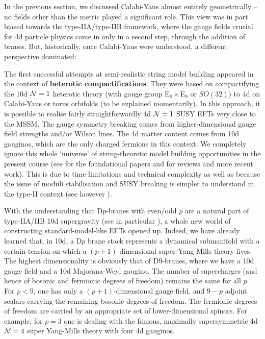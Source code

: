\documentclass[12pt]{article}
\numberwithin{equation}{section}
\begin{document}
In the previous section, we discussed Calabi-Yaus almost entirely geometrically -- no fields other than the metric played a significant role. This view was in part biased towards the type-IIA/type-IIB framework, where the gauge fields crucial for 4d particle physics come in only in a second step, through the addition of branes. But, historically, once Calabi-Yaus were understood, a different perspective dominated:

The first successful attempts at semi-realistic string model building appeared in the context of {\bf heterotic compactifications}. They were based on compactifying the 10d ${\cal N}=1$ heterotic theory (with gauge group E$_8\times$E$_8$ or $SO(32)$) to 4d on Calabi-Yaus or torus orbifolds (to be explained momentarily). In this approach, it is possible to realise fairly straightforwardly 4d ${\cal N}=1$ SUSY EFTs very close to the MSSM. The gauge symmetry breaking comes from higher-dimensional gauge field strengths and/or Wilson lines. The 4d matter content comes from 10d gauginos, which are the only charged fermions in this context. We completely ignore this whole `universe' of string-theoretic model building opportunities in the present course (see \cite{Candelas:1985en, Dixon:1985jw, Ibanez:1986tp} for the foundational papers and \cite{Green:1987sp, Bailin:1999nk, Kobayashi:2004ya, Buchmuller:2005jr, Lebedev:2006kn, Lebedev:2008un, Braun:2005nv, Bouchard:2005ag, Blumenhagen:2006ux, Anderson:2011ns} for reviews and more recent work). This is due to time limitations and technical complexity as well as because the issue of moduli stabilisation and SUSY breaking is simpler to understand in the type-II context (see however \cite{Anderson:2011cza}).

With the understanding that D$p$-branes with even/odd $p$ are a natural part of type-IIA/IIB 10d supergravity (see in particular \cite{Polchinski:1995mt}), a whole new world of constructing standard-model-like EFTs opened up. Indeed, we have already learned that, in 10d, a D$p$ brane stack represents a dynamical submanifold with a certain tension on which a $(p\!+\!1)$-dimensional super-Yang-Mills theory lives. The highest dimensionality is obviously that of D9-branes, where we have a 10d gauge field and a 10d Majorana-Weyl gaugino. The number of supercharges (and hence of bosonic and fermionic degrees of freedom) remains the same for all $p$. For $p<9$, one has only a $(p\!+\!1)$-dimensional gauge field, and $9\!-\!p$ adjoint scalars carrying the remaining bosonic degrees of freedom. The fermionic degrees of freedom are carried by an appropriate set of lower-dimensional spinors. For example, for $p=3$ one is dealing with the famous, maximally supersymmetric 4d ${\cal N}=4$ super Yang-Mills theory with four 4d gauginos.
\end{document}
